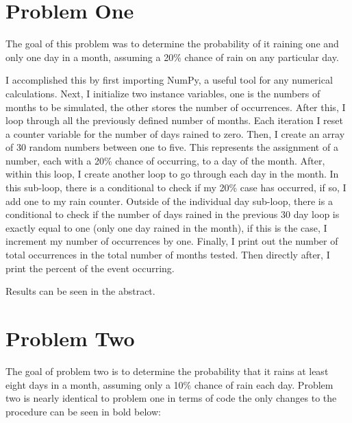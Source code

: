 \documentclass[twocolumn]{revtex4}
\begin{document}
\section{Problem One}
The goal of this problem was to determine the probability of it raining one and only one day in a month, assuming a 20\% chance of rain on any particular day.

I accomplished this by first importing NumPy, a useful tool for any numerical calculations. Next, I initialize two instance variables, one is the numbers of months to be simulated, the other stores the number of occurrences. After this, I loop through all the previously defined number of months. Each iteration I reset a counter variable for the number of days rained to zero. Then, I create an array of 30 random numbers between one to five. This represents the assignment of a number, each with a 20\% chance of occurring, to a day of the month. After, within this loop, I create another loop to go through each day in the month. In this sub-loop, there is a conditional to check if my 20\% case has occurred, if so, I add one to my rain counter. Outside of the individual day sub-loop, there is a conditional to check if the number of days rained in the previous 30 day loop is exactly equal to one (only one day rained in the month), if this is the case, I increment my number of occurrences by one. Finally, I print out the number of total occurrences in the total number of months tested. Then directly after, I print the percent of the event occurring.
\begin{it}Results can be seen in the abstract.
\end{it}
\section{Problem Two}
The goal of problem two is to determine the probability that it rains at least eight days in a month, assuming only a 10\% chance of rain each day. Problem two is nearly identical to problem one in terms of code the only changes to the procedure can be seen in bold below:\newline
\end{document}
